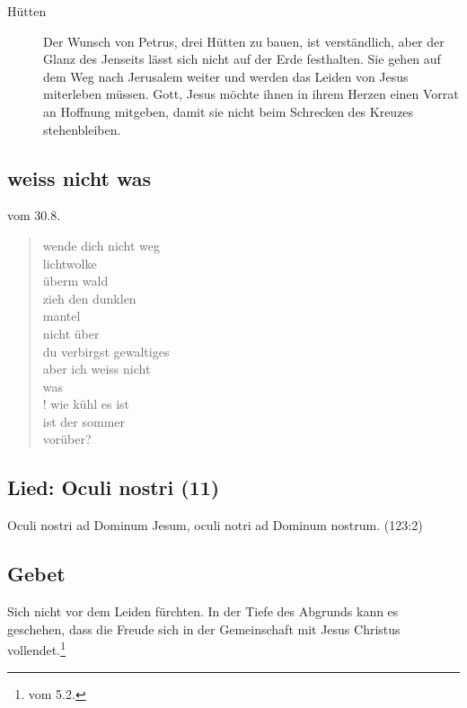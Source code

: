 \begin{impuls}
\begin{description}
\item[Hütten]Der Wunsch von Petrus, drei Hütten zu bauen, ist verständlich, aber der Glanz des Jenseits lässt sich nicht auf der Erde festhalten. Sie gehen auf dem Weg nach Jerusalem weiter und werden das Leiden von Jesus miterleben müssen. Gott, Jesus möchte ihnen in ihrem Herzen einen Vorrat an Hoffnung mitgeben, damit sie nicht beim Schrecken des Kreuzes stehenbleiben.

\end{description}

\end{impuls}

\subsection{weiss nicht was}
\cite{KHH} vom 30.8.
\begin{gedicht}
\begin{verse}
wende dich nicht weg\\
lichtwolke\\
überm wald\\
zieh den dunklen\\
mantel\\
nicht über\\
du verbirgst gewaltiges\\
aber ich weiss nicht\\
was\\!
wie kühl es ist\\
ist der sommer\\
vorüber?
\end{verse}
\end{gedicht}
\subsection{Lied: Oculi nostri (11)}
Oculi nostri ad Dominum Jesum, oculi notri ad Dominum nostrum.
(123:2)

\subsection{Gebet}
Sich nicht vor dem Leiden fürchten. In der Tiefe des Abgrunds kann es geschehen, dass die Freude sich in der Gemeinschaft mit Jesus Christus vollendet.\footnote{\cite{FR-heute} vom 5.2.}
